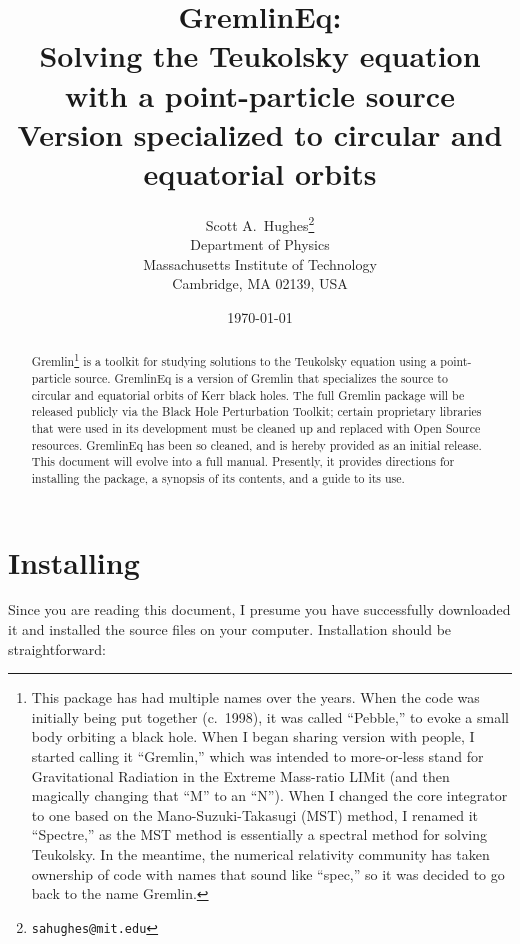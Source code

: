 \documentclass[11pt]{article}
\date{\today}
\begin{document}
\title{GremlinEq:\\ Solving the Teukolsky equation with a point-particle source\\ Version specialized to circular and equatorial orbits}
\author{Scott A.\ Hughes\thanks{\tt sahughes@mit.edu}\\
Department of Physics\\
Massachusetts Institute of Technology\\
Cambridge, MA 02139, USA}

\maketitle

\begin{abstract}
\noindent
Gremlin\footnote{This package has had multiple names over the years.  When the code was initially being put together (c.\ 1998), it was called ``Pebble,'' to evoke a small body orbiting a black hole.  When I began sharing version with people, I started calling it ``Gremlin,'' which was intended to more-or-less stand for Gravitational Radiation in the Extreme Mass-ratio LIMit (and then magically changing that ``M'' to an ``N'').  When I changed the core integrator to one based on the Mano-Suzuki-Takasugi (MST) method, I renamed it ``Spectre,'' as the MST method is essentially a spectral method for solving Teukolsky.  In the meantime, the numerical relativity community has taken ownership of code with names that sound like ``spec,'' so it was decided to go back to the name Gremlin.} is a toolkit for studying solutions to the Teukolsky equation using a point-particle source.  GremlinEq is a version of Gremlin that specializes the source to circular and equatorial orbits of Kerr black holes.  The full Gremlin package will be released publicly via the Black Hole Perturbation Toolkit; certain proprietary libraries that were used in its development must be cleaned up and replaced with Open Source resources.  GremlinEq has been so cleaned, and is hereby provided as an initial release.  This document will evolve into a full manual.  Presently, it provides directions for installing the package, a synopsis of its contents, and a guide to its use.
\end{abstract}

\section{Installing}

Since you are reading this document, I presume you have successfully downloaded it and installed the source files on your computer.  Installation should be straightforward:
\end{document}
